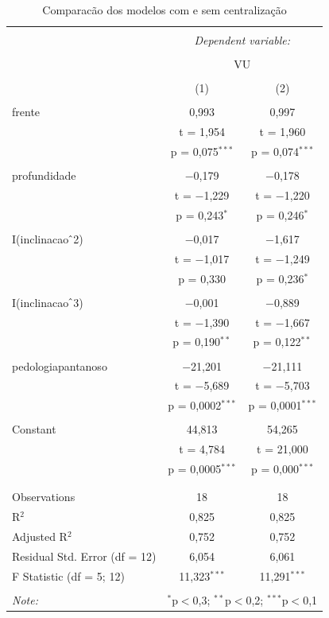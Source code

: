 \documentclass[a4paper, 12pt]{article}
\begin{document}
\begin{table}[!htbp] \centering 
  \caption{Comparacão dos modelos com e sem centralização} 
  \label{tab:fits} 
\begin{tabular}{@{\extracolsep{5pt}}lcc} 
\\[-1.8ex]\hline 
\hline \\[-1.8ex] 
 & \multicolumn{2}{c}{\textit{Dependent variable:}} \\ 
\cline{2-3} 
\\[-1.8ex] & \multicolumn{2}{c}{VU} \\ 
\\[-1.8ex] & (1) & (2)\\ 
\hline \\[-1.8ex] 
 frente & 0,993 & 0,997 \\ 
  & t = 1,954 & t = 1,960 \\ 
  & p = 0,075$^{***}$ & p = 0,074$^{***}$ \\ 
  & & \\ 
 profundidade & $-$0,179 & $-$0,178 \\ 
  & t = $-$1,229 & t = $-$1,220 \\ 
  & p = 0,243$^{*}$ & p = 0,246$^{*}$ \\ 
  & & \\ 
 I(inclinacao$\hat{\mkern6mu}$2) & $-$0,017 & $-$1,617 \\ 
  & t = $-$1,017 & t = $-$1,249 \\ 
  & p = 0,330 & p = 0,236$^{*}$ \\ 
  & & \\ 
 I(inclinacao$\hat{\mkern6mu}$3) & $-$0,001 & $-$0,889 \\ 
  & t = $-$1,390 & t = $-$1,667 \\ 
  & p = 0,190$^{**}$ & p = 0,122$^{**}$ \\ 
  & & \\ 
 pedologiapantanoso & $-$21,201 & $-$21,111 \\ 
  & t = $-$5,689 & t = $-$5,703 \\ 
  & p = 0,0002$^{***}$ & p = 0,0001$^{***}$ \\ 
  & & \\ 
 Constant & 44,813 & 54,265 \\ 
  & t = 4,784 & t = 21,000 \\ 
  & p = 0,0005$^{***}$ & p = 0,000$^{***}$ \\ 
  & & \\ 
\hline \\[-1.8ex] 
Observations & 18 & 18 \\ 
R$^{2}$ & 0,825 & 0,825 \\ 
Adjusted R$^{2}$ & 0,752 & 0,752 \\ 
Residual Std. Error (df = 12) & 6,054 & 6,061 \\ 
F Statistic (df = 5; 12) & 11,323$^{***}$ & 11,291$^{***}$ \\ 
\hline 
\hline \\[-1.8ex] 
\textit{Note:}  & \multicolumn{2}{r}{$^{*}$p$<$0,3; $^{**}$p$<$0,2; $^{***}$p$<$0,1} \\ 
\end{tabular} 
\end{table}
\end{document}
